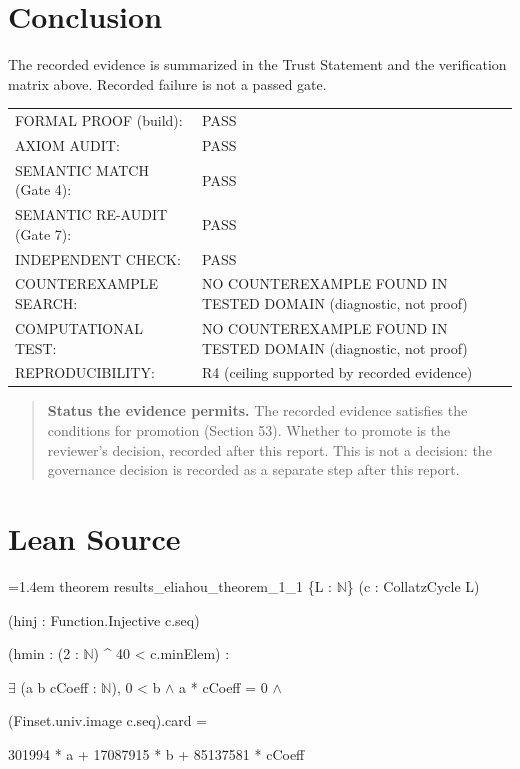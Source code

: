\documentclass[11pt]{article}
\begin{document}
\section{Conclusion}
The recorded evidence is summarized in the Trust Statement and the verification matrix above. Recorded failure is not a passed gate.
\begin{center}\begin{tabular}{@{}p{}p{}@{}}
FORMAL PROOF (build): & PASS \\
AXIOM AUDIT: & PASS \\
SEMANTIC MATCH (Gate 4): & PASS \\
SEMANTIC RE-AUDIT (Gate 7): & PASS \\
INDEPENDENT CHECK: & PASS \\
COUNTEREXAMPLE SEARCH: & NO COUNTEREXAMPLE FOUND IN TESTED DOMAIN (diagnostic, not proof) \\
COMPUTATIONAL TEST: & NO COUNTEREXAMPLE FOUND IN TESTED DOMAIN (diagnostic, not proof) \\
REPRODUCIBILITY: & R4 (ceiling supported by recorded evidence) \\
\end{tabular}\end{center}
\begin{quote}\textbf{Status the evidence permits.} The recorded evidence satisfies the conditions for promotion (Section 53). Whether to promote is the reviewer's decision, recorded after this report. This is not a decision: the governance decision is recorded as a separate step after this report.\end{quote}
\appendix
\section{Lean Source}
{\footnotesize\ttfamily\raggedright\hangindent=1.4em\noindent
\hspace*{0.00em}theorem results\_\allowbreak{}eliahou\_\allowbreak{}theorem\_\allowbreak{}1\_\allowbreak{}1 \{L : \ensuremath{\mathbb{N}}\} (c : CollatzCycle L)\par
\hspace*{2.20em}(hinj : Function.\allowbreak{}Injective c.\allowbreak{}seq)\par
\hspace*{2.20em}(hmin : (2 : \ensuremath{\mathbb{N}}) \textasciicircum{} 40 < c.\allowbreak{}minElem) :\par
\hspace*{2.20em}\ensuremath{\exists} (a b cCoeff : \ensuremath{\mathbb{N}}), 0 < b \ensuremath{\wedge} a * cCoeff = 0 \ensuremath{\wedge}\par
\hspace*{3.30em}(Finset.\allowbreak{}univ.\allowbreak{}image c.\allowbreak{}seq).\allowbreak{}card =\par
\hspace*{4.40em}301994 * a + 17087915 * b + 85137581 * cCoeff\par
}
\end{document}

